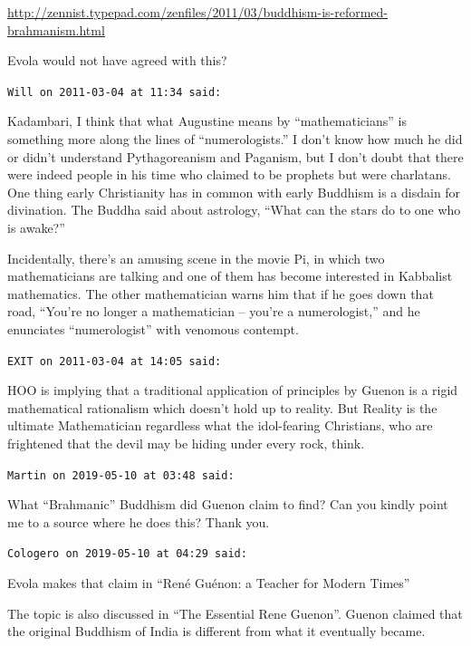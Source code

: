 \begin{footnotesize}
\begin{sffamily}
\url{http://zennist.typepad.com/zenfiles/2011/03/buddhism-is-reformed-brahmanism.html}


Evola would not have agreed with this?

\hfill

\texttt{Will on 2011-03-04 at 11:34 said:}

Kadambari, I think that what Augustine means by ``mathematicians'' is something more along the lines of ``numerologists.'' I don't know how much he did or didn't understand Pythagoreanism and Paganism, but I don't doubt that there were indeed people in his time who claimed to be prophets but were charlatans. One thing early Christianity has in common with early Buddhism is a disdain for divination. The Buddha said about astrology, ``What can the stars do to one who is awake?''

Incidentally, there's an amusing scene in the movie Pi, in which two mathematicians are talking and one of them has become interested in Kabbalist mathematics. The other mathematician warns him that if he goes down that road, ``You're no longer a mathematician -- you're a numerologist,'' and he enunciates ``numerologist'' with venomous contempt.

\hfill

\texttt{EXIT on 2011-03-04 at 14:05 said:}

HOO is implying that a traditional application of principles by Guenon is a rigid mathematical rationalism which doesn't hold up to reality. But Reality is the ultimate Mathematician regardless what the idol-fearing Christians, who are frightened that the devil may be hiding under every rock, think.

\hfill

\texttt{Martin on 2019-05-10 at 03:48 said:}

What ``Brahmanic'' Buddhism did Guenon claim to find? Can you kindly point me to a source where he does this? Thank you.

\hfill

\texttt{Cologero on 2019-05-10 at 04:29 said:}

Evola makes that claim in ``René Guénon: a Teacher for Modern Times''

The topic is also discussed in ``The Essential Rene Guenon''. Guenon claimed that the original Buddhism of India is different from what it eventually became.

\hfill

\end{sffamily}
\end{footnotesize}

